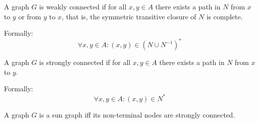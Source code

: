 \begin{definition}
    \begin{subdefinition}
        A graph \(G\) is weakly connected if for all \(x, y \in A\) there exists a path in \( N \) from \(x\) to \(y\) or from \(y\) to \( x \), that is, the symmetric transitive closure of \(N\) is complete.
        
        Formally: 
            \[
                \forall x, y \in A : (x, y) \in (N \cup N^{-1})^*
            \]
        \label{def:weakly-connected}
    \end{subdefinition}
    
    \begin{subdefinition}
        A graph \(G\) is strongly connected if for all \(x, y \in A\) there exists a path in \( N \) from \(x\) to \(y\).
        
        Formally:
            \[
                \forall x, y \in A : (x, y) \in N^*
            \]
        \label{def:strongly-connected}
    \end{subdefinition}
    
    \begin{subdefinition}
        A graph \(G\) is a sun graph iff its non-terminal nodes are strongly connected.
        \label{def:sun-graph}
    \end{subdefinition}
\end{definition}

